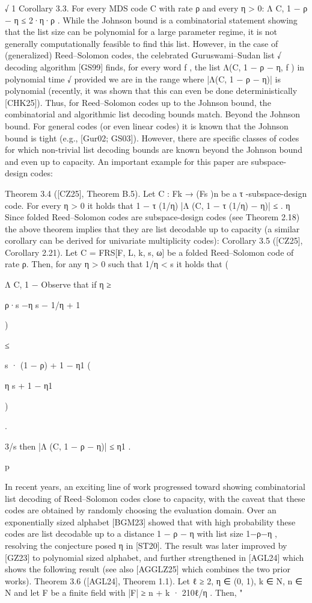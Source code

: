 \documentclass[11pt]{article}
\begin{document}
√
1
Corollary 3.3. For every MDS code C with rate ρ and every η > 0: Λ C, 1 − ρ − η ≤ 2·η·ρ
.
While the Johnson bound is a combinatorial statement showing that the list size can be polynomial for a large parameter regime, it is not generally computationally feasible to find this list.
However, in the case of (generalized) Reed–Solomon codes, the celebrated Guruswami–Sudan list
√
decoding algorithm [GS99] finds, for every word f , the list Λ(C, 1 − ρ − η, f ) in polynomial time
√
provided we are in the range where |Λ(C, 1 − ρ − η)| is polynomial (recently, it was shown that this
can even be done deterministically [CHK25]). Thus, for Reed–Solomon codes up to the Johnson
bound, the combinatorial and algorithmic list decoding bounds match.
Beyond the Johnson bound. For general codes (or even linear codes) it is known that the
Johnson bound is tight (e.g., [Gur02; GS03]). However, there are specific classes of codes for which
non-trivial list decoding bounds are known beyond the Johnson bound and even up to capacity.
An important example for this paper are subspace-design codes:

Theorem 3.4 ([CZ25], Theorem B.5). Let C : Fk → (Fs )n be a τ -subspace-design code. For every
η > 0 it holds that
1 − τ (1/η)
|Λ (C, 1 − τ (1/η) − η)| ≤
.
η
Since folded Reed–Solomon codes are subspace-design codes (see Theorem 2.18) the above
theorem implies that they are list decodable up to capacity (a similar corollary can be derived for
univariate multiplicity codes):
Corollary 3.5 ([CZ25], Corollary 2.21). Let C = FRS[F, L, k, s, ω] be a folded Reed–Solomon code
of rate ρ. Then, for any η > 0 such that 1/η < s it holds that
(

Λ C, 1 −
Observe that if η ≥

ρ·s
−η
s − 1/η + 1

)

≤

s · (1 − ρ) + 1 − η1
(

η s + 1 − η1

)

.

3/s then |Λ (C, 1 − ρ − η)| ≤ η1 .

p

In recent years, an exciting line of work progressed toward showing combinatorial list decoding
of Reed–Solomon codes close to capacity, with the caveat that these codes are obtained by randomly
choosing the evaluation domain.
Over an exponentially sized alphabet [BGM23] showed that with high probability these codes
are list decodable up to a distance 1 − ρ − η with list size 1−ρ−η
, resolving the conjecture posed
η
in [ST20]. The result was later improved by [GZ23] to polynomial sized alphabet, and further
strengthened in [AGL24] which shows the following result (see also [AGGLZ25] which combines the
two prior works).
Theorem 3.6 ([AGL24], Theorem 1.1). Let ℓ ≥ 2, η ∈ (0, 1), k ∈ N, n ∈ N and let F be a finite
field with |F| ≥ n + k · 210ℓ/η . Then,
"
\end{document}
